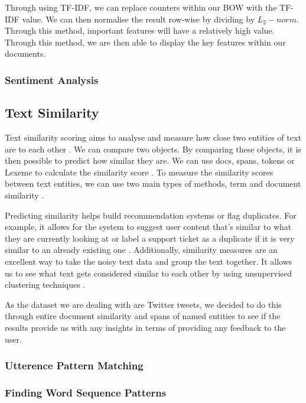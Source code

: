 	Through using TF-IDF, we can replace counters within our BOW with the TF-IDF value. We can then normalise the result row-wise by dividing by $L_2-norm$. Through this method, important features will have a relatively high value. Through this method, we are then able to display the key features within our documents.
	
	
	\subsubsection{Sentiment Analysis}
	
	\subsection{Text Similarity} %
	Text similarity scoring aims to analyse and measure how close two entities of text are to each other \cite{sarkar2016text}. We can compare two objects. By comparing these objects, it is then possible to predict how similar they are. We can use docs, spans, tokens or Lexeme to calculate the similarity score \cite{spacy_vec_sim}. To measure the similarity scores between text entities, we can use two main types of methods, term and document similarity \cite{sarkar2016text}. 
	
	Predicting similarity helps build recommendation systems or flag duplicates. For example, it allows for the system to suggest user content that's similar to what they are currently looking at or label a support ticket as a duplicate if it is very similar to an already existing one \cite{spacy_vec_sim}. Additionally, similarity measures are an excellent way to take the noisy text data and group the text together. It allows us to see what text gets considered similar to each other by using unsupervised clustering techniques \cite{sarkar2016text}.
	
	As the dataset we are dealing with are Twitter tweets, we decided to do this through entire document similarity and spans of named entities to see if the results provide us with any insights in terms of providing any feedback to the user. 
	
	
	\subsubsection{Utterence Pattern Matching}
	
	\subsubsection{Finding Word Sequence Patterns}
	
